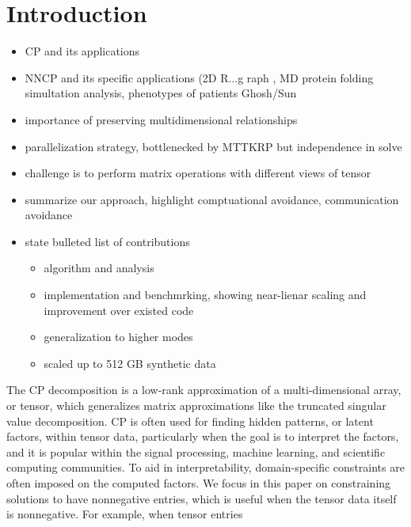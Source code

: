 
\section{Introduction}

\begin{itemize}
	\item CP and its applications
	\item NNCP and its specific applications (2D R...g raph \cite{JC+16}, MD protein folding simultation analysis, phenotypes of patients Ghosh/Sun
	\item importance of preserving multidimensional relationships
	\item parallelization strategy, bottlenecked by MTTKRP but independence in solve
	\item challenge is to perform matrix operations with different views of tensor
	\item summarize our approach, highlight comptuational avoidance, communication avoidance
	\item state bulleted list of contributions
	\begin{itemize}
		\item algorithm and analysis
		\item implementation and benchmrking, showing near-lienar scaling and improvement over existed code
		\item generalization to higher modes
		\item scaled up to 512 GB synthetic data
	\end{itemize}
\end{itemize}

The CP decomposition is a low-rank approximation of a multi-dimensional array, or tensor, which generalizes matrix approximations like the truncated singular value decomposition.
CP is often used for finding hidden patterns, or latent factors, within tensor data, particularly when the goal is to interpret the factors, and it is popular within the signal processing, machine learning, and scientific computing communities.
To aid in interpretability, domain-specific constraints are often imposed on the computed factors.
We focus in this paper on constraining solutions to have nonnegative entries, which is useful when the tensor data itself is nonnegative.
For example, when tensor entries